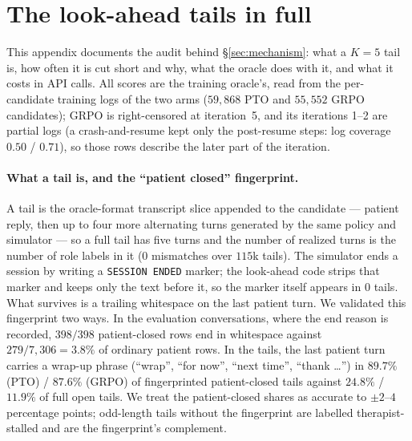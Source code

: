 \section{The look-ahead tails in full}
\label{app:tails}

This appendix documents the audit behind \S\ref{sec:mechanism}: what a $K{=}5$ tail is, how
often it is cut short and why, what the oracle does with it, and what it costs in API calls.
All scores are the training oracle's, read from the per-candidate training logs of the two
\Kf{} arms ($59{,}868$ PTO and $55{,}552$ GRPO candidates); GRPO \Kf{} is right-censored at
iteration~5, and its iterations 1--2 are partial logs (a crash-and-resume kept only the
post-resume steps: log coverage $0.50$ / $0.71$), so those rows describe the later part of
the iteration.

\paragraph{What a tail is, and the ``patient closed'' fingerprint.} A tail is the
oracle-format transcript slice appended to the candidate --- patient reply, then up to four
more alternating turns generated by the same policy and simulator --- so a full tail has five
turns and the number of realized turns is the number of role labels in it (0 mismatches over
$115$k tails). The simulator ends a session by writing a \texttt{SESSION ENDED} marker; the
look-ahead code strips that marker and keeps only the text before it, so the marker itself
appears in $0$ tails. What survives is a trailing whitespace on the last patient turn. We
validated this fingerprint two ways. In the evaluation conversations, where the end reason
is recorded, $398/398$ patient-closed rows end in whitespace against $279/7{,}306 = 3.8\%$
of ordinary patient rows. In the tails, the last patient turn carries a wrap-up phrase
(``wrap'', ``for now'', ``next time'', ``thank \ldots'') in $89.7\%$ (PTO) / $87.6\%$
(GRPO) of fingerprinted patient-closed tails against $24.8\%$ / $11.9\%$ of full open tails.
We treat the patient-closed shares as accurate to $\pm 2$--$4$ percentage points; odd-length
tails without the fingerprint are labelled therapist-stalled and are the fingerprint's
complement.

